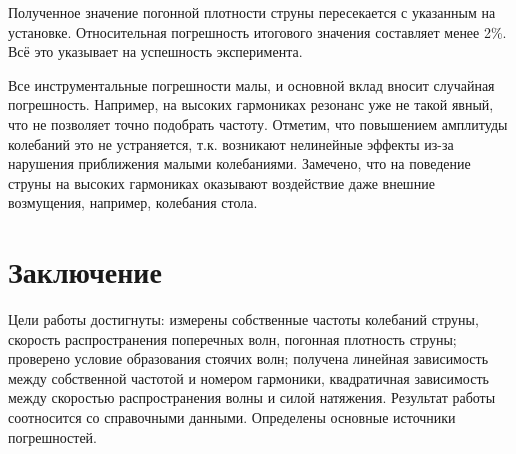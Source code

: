 \documentclass{article}
\begin{document}
\hspace{4mm} Полученное значение погонной плотности струны пересекается с указанным на установке. Относительная погрешность итогового значения составляет менее 2\%. Всё это указывает на успешность эксперимента. 

Все инструментальные погрешности малы, и основной вклад вносит случайная погрешность. Например, на высоких гармониках резонанс уже не такой явный, что не позволяет точно подобрать частоту. Отметим, что повышением амплитуды колебаний это не устраняется, т.к. возникают нелинейные эффекты из-за нарушения приближения малыми колебаниями. Замечено, что на поведение струны на высоких гармониках оказывают воздействие даже внешние возмущения, например, колебания стола.   

\section*{Заключение}
\hspace{4mm} Цели работы достигнуты: измерены собственные частоты колебаний струны, скорость распространения поперечных волн, погонная плотность струны; проверено условие образования стоячих волн; получена линейная зависимость между собственной частотой и номером гармоники, квадратичная зависимость между скоростью распространения волны и силой натяжения. Результат работы соотносится со справочными данными. Определены основные источники погрешностей.
\end{document}
